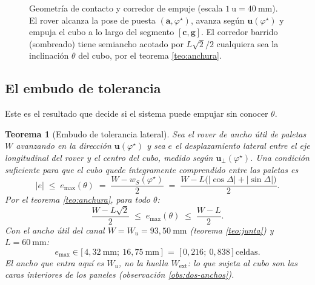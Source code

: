 \documentclass[11pt,a4paper]{article}
\newtheorem{teorema}{Teorema}[section]
\theoremstyle{definition}
\newcommand{\uu}{\mathbf{u}}
\newcommand{\cc}{\mathbf{c}}
\newcommand{\gv}{\mathbf{g}}
\newcommand{\aaa}{\mathbf{a}}
\begin{document}
\begin{figure}[htbp]
\caption{Geometría de contacto y corredor de empuje (escala $1\ \mathrm{u} = 40\ \mathrm{mm}$).
El rover alcanza la pose de puesta $(\aaa,\varphi^\star)$, avanza según
$\uu(\varphi^\star)$ y empuja el cubo a lo largo del segmento $[\cc,\gv]$. El corredor
barrido (sombreado) tiene semiancho acotado por $L\sqrt2/2$ cualquiera sea la
inclinación $\theta$ del cubo, por el teorema \ref{teo:anchura}.}
\label{fig:contacto}
\end{figure}

\subsection{El embudo de tolerancia}
\label{sec:embudo}

Este es el resultado que decide si el sistema puede empujar sin conocer $\theta$.

\begin{teorema}[Embudo de tolerancia lateral]
\label{teo:embudo}
Sea el rover de ancho útil de paletas $W$ avanzando en la dirección $\uu(\varphi^\star)$
y sea $e$ el desplazamiento lateral entre el eje longitudinal del rover y el centro del
cubo, medido según $\uu_\perp(\varphi^\star)$. Una condición suficiente para que el cubo
quede íntegramente comprendido entre las paletas es
\begin{equation}
  |e| \;\le\; e_{\max}(\theta) \;=\; \frac{W - w_S(\varphi^\star)}{2}
   \;=\; \frac{W - L\big(|\cos\Delta| + |\sin\Delta|\big)}{2}.
  \label{eq:emax}
\end{equation}
Por el teorema \ref{teo:anchura}, para todo $\theta$:
\begin{equation}
  \boxed{\
  \frac{W - L\sqrt2}{2} \;\le\; e_{\max}(\theta) \;\le\; \frac{W - L}{2}.\ }
  \label{eq:emax-cota}
\end{equation}
Con el ancho \emph{útil del canal} $W = W_u = 93{,}50\ \mathrm{mm}$
(teorema \ref{teo:junta}) y $L = 60\ \mathrm{mm}$:
\[
  e_{\max} \in \big[\,4{,}32\ \mathrm{mm};\ 16{,}75\ \mathrm{mm}\,\big]
  \;=\; \big[\,0{,}216;\ 0{,}838\,\big]\ \text{celdas}.
\]
El ancho que entra aquí es $W_u$, no la huella $W_{\mathrm{ext}}$: lo que sujeta al cubo
son las caras interiores de los paneles (observación \ref{obs:dos-anchos}).
\end{teorema}
\end{document}
